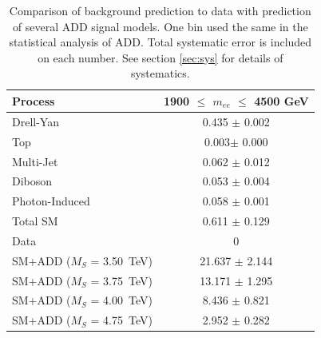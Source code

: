 	\begin {table}[h]
		\begin{center}
		\begin{tabular}{  l | c } 
			\hline
			\hline
			Process & 1900 $\le$ $m_{ee}$ $\le$ 4500 GeV \\
			\hline
			Drell-Yan & 0.435 $\pm$ 0.002 \\
			Top & 0.003$\pm$ 0.000 \\
			Multi-Jet & 0.062 $\pm$ 0.012 \\
			Diboson & 0.053 $\pm$ 0.004 \\
			Photon-Induced & 0.058 $\pm$ 0.001 \\
			\hline
			Total SM & 0.611 $\pm$ 0.129 \\
			\hline
			Data & 0 \\ 
			\hline
			SM+ADD ($M_{S}$ = 3.50~TeV)& 21.637 $\pm$  2.144 \\
			SM+ADD ($M_{S}$ = 3.75~TeV)& 13.171 $\pm$  1.295 \\
			SM+ADD ($M_{S}$ = 4.00~TeV)& 8.436 $\pm$  0.821 \\
			SM+ADD ($M_{S}$ = 4.75~TeV)& 2.952 $\pm$  0.282 \\
	    	\hline
	    	\hline
	  	\end{tabular}
	  	\caption{Comparison of background prediction to data with prediction of several ADD signal models. One bin used the same in the statistical analysis of ADD. Total systematic error is included on each number. See section \ref{sec:sys} for details of systematics.}
	  	\label{tab:ADD_results}
	  	\end{center}
	\end {table}









